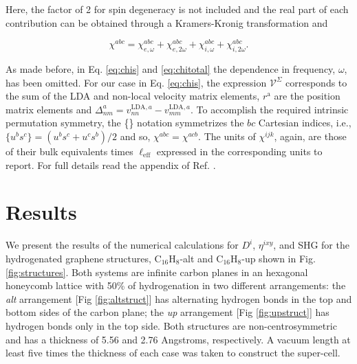 \documentclass[aps,pra,11pt,tightenlines,showpacs,superscriptaddress,groupedaddress]{revtex4-1}
\newcommand{\di}{$D^{i}$}
\newcommand{\ea}{$\eta^{ixy}$}
\newcommand{\altstc}{C$_{16}$H$_{8}$-alt}
\newcommand{\upstc}{C$_{16}$H$_{8}$-up}
\begin{document}
\noindent Here, the factor of 2 for spin degeneracy is not included and the
real part of each contribution can be obtained through a Kramers-Kronig
transformation \cite{tancogne2014effect} and

\begin{equation}\label{eq:chitotal}
    \chi^{abc} = \chi^{abc}_{e,\omega} + \chi^{abc}_{e,2\omega} +
    \chi^{abc}_{i,\omega} + \chi^{abc}_{i,2\omega}
    .
\end{equation}

As made before, in Eq. \ref{eq:chis} and \ref{eq:chitotal} the dependence in
frequency, $\omega$, has been omitted. For our case in Eq. \ref{eq:chis}, the
expression $\mathcal{V}^{\Sigma}$ corresponds to the sum of the LDA and 
non-local velocity matrix elements, $r^{\mathrm{a}} $ are the position matrix
elements and $\Delta^{a}_{nm} = v^{\text{LDA},a}_{nn} - v^{\text{LDA},a}_{mm}
$. To accomplish the required intrinsic permutation symmetry, the \{\} notation
symmetrizes the $bc$ Cartesian indices, i.e., $\{u^{b}s^{c}\} = (u^{b}s^{c} +
u^{c}s^{b})/{2}$ and so, $\chi^{abc} = \chi^{acb}$. The units of $\chi^{ijk} $,
again, are those of their bulk equivalents times $\ell_{\text{eff}}$ expressed
in the corresponding units to report. For full details read the appendix of
Ref. \cite{anderson2015theory}.







\section{Results} %
\label{sec:results}

We present the results of the numerical calculations for {\di}, {\ea}, and SHG for
the hydrogenated graphene structures, {\altstc} and {\upstc} shown in Fig.
\ref{fig:structures}. Both systems are infinite carbon planes in an
hexagonal honeycomb lattice with 50\% of hydrogenation in two different
arrangements: the \emph{alt} arrangement [Fig \ref{fig:altstruct}] has
alternating hydrogen bonds in the top and bottom sides of the carbon plane; the
\emph{up} arrangement [Fig \ref{fig:upstruct}] has hydrogen bonds only in the top
side. Both structures are non-centrosymmetric and has a thickness of 5.56 and
2.76 Angstroms, respectively. A vacuum length at least  five times the
thickness of each case was taken to construct the super-cell.
\end{document}
